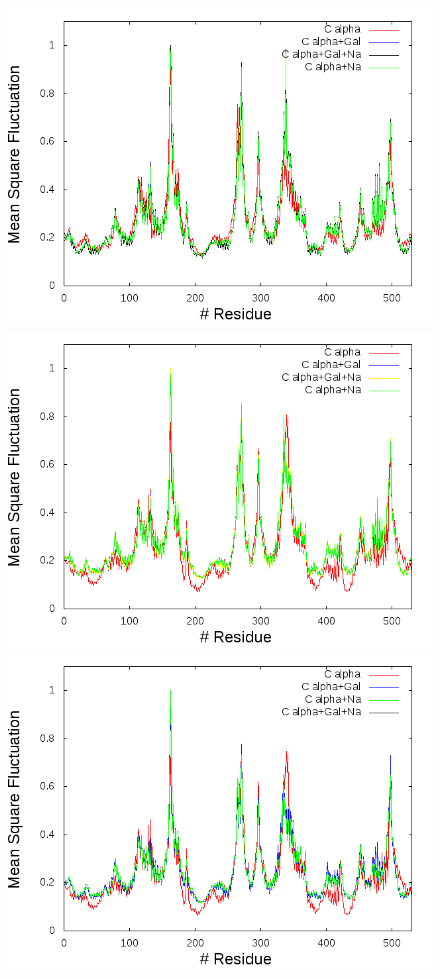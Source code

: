 \begin{figure}
   \includegraphics[scale=0.3]{./Kap4/ANM/ANM_server/grafica_10_A_n.png}
    \includegraphics[scale=0.3]{./Kap4/ANM/ANM_server/grafica_11_A_n.png}
     \includegraphics[scale=0.3]{./Kap4/ANM/ANM_server/grafica_12_A_n.png}

\end{figure}
